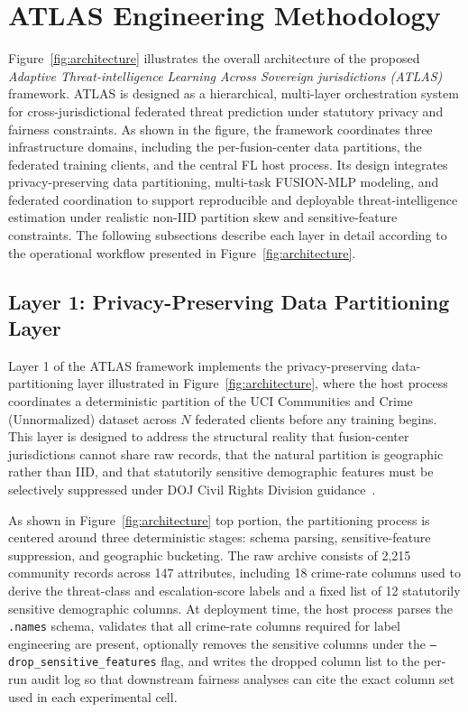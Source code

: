 \documentclass[conference]{IEEEtran}
\begin{document}
\section{ATLAS Engineering Methodology}
\label{sec:method}

Figure~\ref{fig:architecture} illustrates the overall architecture of the proposed \textit{Adaptive Threat-intelligence Learning Across Sovereign jurisdictions (ATLAS)} framework. ATLAS is designed as a hierarchical, multi-layer orchestration system for cross-jurisdictional federated threat prediction under statutory privacy and fairness constraints. As shown in the figure, the framework coordinates three infrastructure domains, including the per-fusion-center data partitions, the federated training clients, and the central FL host process. Its design integrates privacy-preserving data partitioning, multi-task FUSION-MLP modeling, and federated coordination to support reproducible and deployable threat-intelligence estimation under realistic non-IID partition skew and sensitive-feature constraints. The following subsections describe each layer in detail according to the operational workflow presented in Figure~\ref{fig:architecture}.

\subsection{Layer 1: Privacy-Preserving Data Partitioning Layer}
\label{sec:method:partition}

Layer 1 of the ATLAS framework implements the privacy-preserving data-partitioning layer illustrated in Figure~\ref{fig:architecture}, where the host process coordinates a deterministic partition of the UCI Communities and Crime (Unnormalized) dataset across $N$ federated clients before any training begins. This layer is designed to address the structural reality that fusion-center jurisdictions cannot share raw records, that the natural partition is geographic rather than IID, and that statutorily sensitive demographic features must be selectively suppressed under DOJ Civil Rights Division guidance~\cite{doj2016cr}.

As shown in Figure~\ref{fig:architecture} top portion, the partitioning process is centered around three deterministic stages: schema parsing, sensitive-feature suppression, and geographic bucketing. The raw archive consists of 2{,}215 community records across 147 attributes, including 18 crime-rate columns used to derive the threat-class and escalation-score labels and a fixed list of 12 statutorily sensitive demographic columns. At deployment time, the host process parses the \texttt{.names} schema, validates that all crime-rate columns required for label engineering are present, optionally removes the sensitive columns under the \texttt{--drop\_sensitive\_features} flag, and writes the dropped column list to the per-run audit log so that downstream fairness analyses can cite the exact column set used in each experimental cell.
\end{document}
